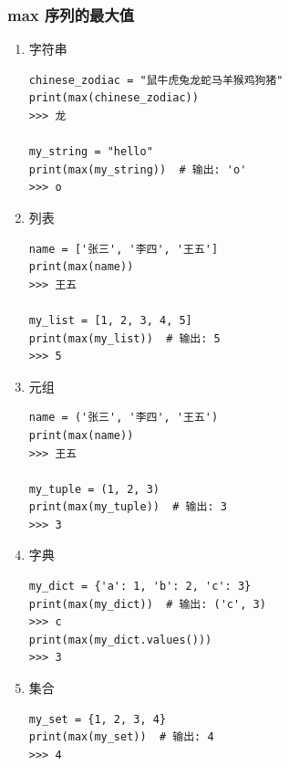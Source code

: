 \subsubsection{max 序列的最大值}

\begin{enumerate}[label=\arabic*)]
    \item 字符串
\begin{lstlisting}[style=demostyle,numbers=none]
chinese_zodiac = "鼠牛虎兔龙蛇马羊猴鸡狗猪"
print(max(chinese_zodiac))
>>> 龙

my_string = "hello"
print(max(my_string))  # 输出: 'o'
>>> o
\end{lstlisting}

    \item 列表
\begin{lstlisting}[style=demostyle,numbers=none]
name = ['张三', '李四', '王五']
print(max(name))
>>> 王五

my_list = [1, 2, 3, 4, 5]
print(max(my_list))  # 输出: 5
>>> 5
\end{lstlisting}

    \item 元组
\begin{lstlisting}[style=demostyle,numbers=none]
name = ('张三', '李四', '王五')
print(max(name))
>>> 王五

my_tuple = (1, 2, 3)
print(max(my_tuple))  # 输出: 3
>>> 3
\end{lstlisting}

    \item 字典
\begin{lstlisting}[style=demostyle,numbers=none]
my_dict = {'a': 1, 'b': 2, 'c': 3}
print(max(my_dict))  # 输出: ('c', 3)
>>> c
print(max(my_dict.values()))
>>> 3
\end{lstlisting}

    \item 集合
\begin{lstlisting}[style=demostyle,numbers=none]
my_set = {1, 2, 3, 4}
print(max(my_set))  # 输出: 4
>>> 4
\end{lstlisting}
\end{enumerate}


